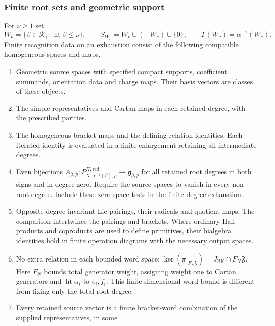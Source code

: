\subsubsection*{Finite root sets and geometric support}

\begin{definition}
\label{def:cofinal-primitive-recognition-datum}
For $\nu\geq1$ set
\[
 W_\nu=\{\beta\in\mathcal R_+:\operatorname{ht}\beta\leq\nu\},
 \qquad S_{W_\nu}=W_\nu\cup(-W_\nu)\cup\{0\},
 \qquad \Gamma(W_\nu)=\alpha^{-1}(W_\nu).
\]
Finite recognition data on an exhaustion consist of the following
compatible homogeneous spaces and maps.
\begin{enumerate}
\item[\textup{(R0)}] Geometric source spaces with specified compact
supports, coefficient summands, orientation data and charge maps.
Their basis vectors are classes of these objects.
\item[\textup{(R1)}] The simple representatives and Cartan maps
in each retained degree, with the prescribed parities.
\item[\textup{(R2)}] The homogeneous bracket maps and the defining
relation identities. Each iterated identity is evaluated in a
finite enlargement retaining all intermediate degrees.
\item[\textup{(R3)}] Even bijections
$A_{\beta,\bar p}:P^{\Pi,\mathrm{red}}_{X,\alpha^{-1}(\beta),\bar p}
\to\mathfrak g_{\beta,\bar p}$ for all retained root degrees in both signs and in degree zero.
Require the source spaces to vanish in every non-root degree.
Include these zero-space tests in the finite degree exhaustion.
\item[\textup{(R4)}] Opposite-degree invariant Lie pairings, their
radicals and quotient maps. The comparison intertwines the pairings
and brackets. Where ordinary Hall products and coproducts are
used to define primitives, their bialgebra identities hold in
finite operation diagrams with the necessary output spaces.
\item[\textup{(R5)}] No extra relation in each bounded word space:
$\ker(\pi|_{F_N\mathfrak F})=J_{\mathrm{BK}}\cap F_N\mathfrak F$.
Here $F_N$ bounds total generator weight, assigning weight one to
Cartan generators and $\operatorname{ht}\alpha_i$ to $e_i,f_i$.
This finite-dimensional word bound is different from fixing only
the total root degree.
\item[\textup{(R6)}] Every retained source vector is a finite
bracket-word combination of the supplied representatives, in some

\end{enumerate}
\end{definition}
